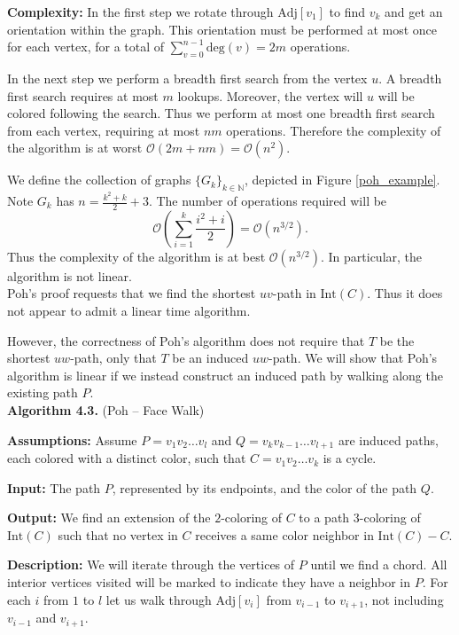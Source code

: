 \documentclass[letterpaper, 12pt]{article}
\theoremstyle{definition}
\theoremstyle{definition}
\theoremstyle{thm}
\theoremstyle{definition}
\begin{document}
\noindent\textbf{Complexity:} In the first step we rotate through
$\text{Adj}[v_1]$ to find $v_k$ and get an orientation within the graph. This
orientation must be performed at most once for each vertex, for a total of
$\sum_{v=0}^{n-1}\text{deg}(v)=2m$ operations.

In the next step we perform a breadth first search from the vertex $u$.
A breadth first search requires at most $m$ lookups. Moreover, the vertex will
$u$ will be colored following the search. Thus we perform at most one breadth
first search from each vertex, requiring at most $nm$ operations.
Therefore the complexity of the algorithm is at worst
$\mathcal{O}(2m + nm)=\mathcal{O}(n^2)$.

We define the collection of graphs $\{G_k\}_{k\in\mathbb{N}}$, depicted in
Figure \ref{poh_example}.
Note $G_k$ has $n=\frac{k^2+k}{2}+3$. The number of operations required will be
\[
    \mathcal{O}\left(\sum_{i=1}^k \frac{i^2+i}{2}\right)=\mathcal{O}(n^{3/2}).
\]
Thus the complexity of the algorithm is at best $\mathcal{O}(n^{3/2})$. In
particular, the algorithm is not linear.\\

Poh's proof requests that we find the shortest $uv$-path in $\text{Int}(C)$.
Thus it does not appear to admit a linear time algorithm.

However, the correctness of Poh's algorithm does not require that $T$
be the shortest $uw$-path, only that $T$ be an induced $uw$-path. We will show
that Poh's algorithm is linear if we instead construct an induced path by
walking along the existing path $P$.\\

\noindent\textbf{Algorithm 4.3.} (Poh -- Face Walk)

\noindent\textbf{Assumptions:} Assume $P=v_1v_2\ldots v_l$ and
$Q=v_kv_{k-1}\ldots v_{l+1}$ are induced paths, each colored with a distinct
color, such that $C=v_1v_2\ldots v_k$ is a cycle.

\noindent\textbf{Input:} The path $P$, represented by its endpoints, and the
color of the path $Q$.

\noindent\textbf{Output:} We find an extension of the $2$-coloring of $C$ to
a path $3$-coloring of $\text{Int}(C)$ such that
no vertex in $C$ receives a same color neighbor in $\text{Int}(C)-C$.

\noindent\textbf{Description:} 
We will iterate through the vertices of $P$ until we find a chord. All interior
vertices visited will be marked to indicate they have a neighbor in $P$. For
each $i$ from $1$ to $l$ let us walk through
$\text{Adj}[v_i]$ from $v_{i-1}$ to $v_{i+1}$, not including
$v_{i-1}$ and $v_{i+1}$.
\end{document}
